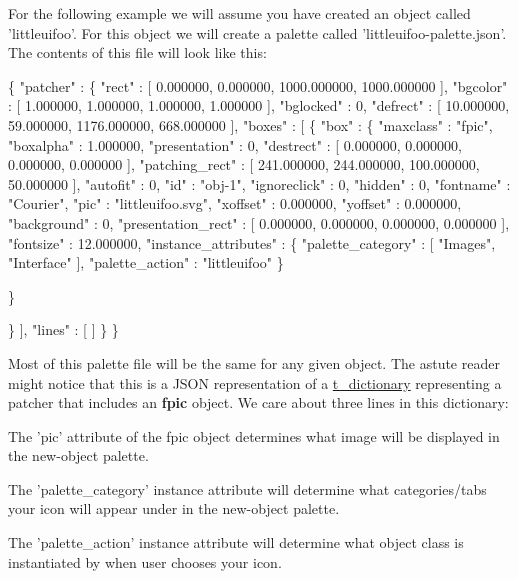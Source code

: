 For the following example we will assume you have created an object called 'littleuifoo'. For this object we will create a palette called 'littleuifoo-\/palette.json'. The contents of this file will look like this: 
\begin{DoxyPre}
\{
	"patcher" : 	\{
		"rect" : [ 0.000000, 0.000000, 1000.000000, 1000.000000 ],
		"bgcolor" : [ 1.000000, 1.000000, 1.000000, 1.000000 ],
		"bglocked" : 0,
		"defrect" : [ 10.000000, 59.000000, 1176.000000, 668.000000 ],
		"boxes" : [ 			\{
				"box" : 				\{
					"maxclass" : "fpic",
					"boxalpha" : 1.000000,
					"presentation" : 0,
					"destrect" : [ 0.000000, 0.000000, 0.000000, 0.000000 ],
					"patching\_rect" : [ 241.000000, 244.000000, 100.000000, 50.000000 ],
					"autofit" : 0,
					"id" : "obj-1",
					"ignoreclick" : 0,
					"hidden" : 0,
					"fontname" : "Courier",
					"pic" : "littleuifoo.svg",
					"xoffset" : 0.000000,
					"yoffset" : 0.000000,
					"background" : 0,
					"presentation\_rect" : [ 0.000000, 0.000000, 0.000000, 0.000000 ],
					"fontsize" : 12.000000,
					"instance\_attributes" : 					\{
						"palette\_category" : [ "Images", "Interface" ],
						"palette\_action" : "littleuifoo"
					\}\end{DoxyPre}



\begin{DoxyPre}				\}\end{DoxyPre}



\begin{DoxyPre}			\}
 		],
		"lines" : [  ]
	\}
\}	
\end{DoxyPre}


Most of this palette file will be the same for any given object. The astute reader might notice that this is a JSON representation of a \hyperlink{structt__dictionary}{t\_\-dictionary} representing a patcher that includes an {\bfseries fpic} object. We care about three lines in this dictionary: 
\begin{DoxyEnumerate}
\item The 'pic' attribute of the fpic object determines what image will be displayed in the new-\/object palette. 
\item The 'palette\_\-category' instance attribute will determine what categories/tabs your icon will appear under in the new-\/object palette. 
\item The 'palette\_\-action' instance attribute will determine what object class is instantiated by when user chooses your icon. 
\end{DoxyEnumerate}